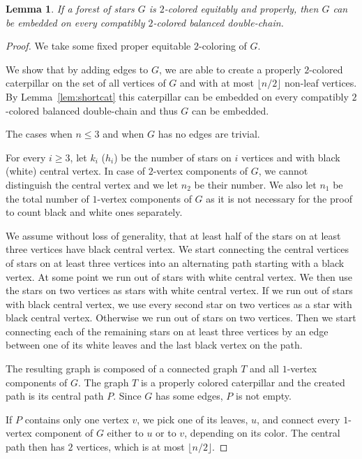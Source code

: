 \documentclass[12pt]{article}
\newtheorem{lemma}[theorem]{Lemma}
\begin{document}
\begin{lemma}
If a forest of stars $G$ is $2$-colored equitably and properly, then $G$ can be embedded on every 
compatibly $2$-colored balanced double-chain.
\end{lemma}
\begin{proof}
We take some fixed proper equitable $2$-coloring of $G$. 

We show that by adding edges to $G$, we are able to create a properly $2$-colored
caterpillar on the set of all vertices of $G$ and with at most $\lfloor n/2 \rfloor$ non-leaf vertices.
By Lemma~\ref{lem:shortcat} this caterpillar can be embedded on every compatibly $2$-colored balanced 
double-chain and thus $G$ can be embedded.

The cases when $n \leq 3$ and when $G$ has no edges are trivial.

For every $i\geq 3$, let $k_i$ ($h_i$) be the number of stars on $i$ vertices and with black (white) central vertex.
In case of $2$-vertex components of $G$, we cannot distinguish the 
central vertex and we let $n_2$ be their number. We also let $n_1$ be the total number of $1$-vertex 
components of $G$ as it is not necessary for the proof to count black and white ones separately.

We assume without loss of generality, that at least half of the stars on at least three vertices have black central vertex.
We start connecting the central vertices of stars on at least three vertices into an alternating path starting 
with a black vertex. At some point we run out of stars with white central vertex. We then use the stars on 
two vertices as stars with 
white central vertex. If we run out of stars with black central vertex, we use every second star on two vertices as 
a star with black central vertex. Otherwise we run out of stars on two vertices. Then we start connecting 
each of the remaining stars on at least three vertices by an edge between one of its white leaves and the last 
black vertex on the path.

The resulting graph is composed of a connected graph $T$ and all $1$-vertex components of $G$. The graph $T$ is 
a properly colored caterpillar and the created path is its central path $P$. 
Since $G$ has some edges, $P$ is not empty.

If $P$ contains only one vertex $v$, we pick one of its leaves, $u$, and connect every $1$-vertex component of $G$
either to $u$ or to $v$, depending on its color. The central path then has $2$ vertices, which is at most 
$\lfloor n/2 \rfloor$.


\end{proof}
\end{document}
